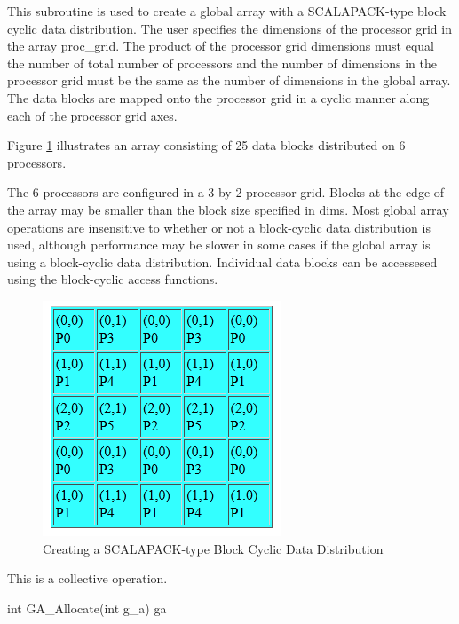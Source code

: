 \documentclass[12pt]{article}
\begin{document}
\begin{desc}

  This subroutine is used to create a global array with a
  SCALAPACK-type block cyclic data distribution. The user specifies
  the dimensions of the processor grid in the array proc_grid. The
  product of the processor grid dimensions must equal the number of
  total number of processors and the number of dimensions in the
  processor grid must be the same as the number of dimensions in the
  global array. The data blocks are mapped onto the processor grid in
  a cyclic manner along each of the processor grid axes. 

Figure \ref{setblkcyprocgrid} illustrates an array consisting of 25 data blocks distributed on 6 processors.

The 6 processors are configured in a 3 by 2 processor grid. Blocks at the edge of the array may be smaller than the block size specified in dims. Most global array operations  are insensitive to whether or not a block-cyclic data distribution is used, although performance may be slower in some cases if the global array is using a block-cyclic data distribution. Individual data blocks can be accessesed using the block-cyclic access functions.

\begin{figure}
\centering
\includegraphics{SetBlkCyProcGrid}
\caption{Creating a SCALAPACK-type Block Cyclic Data Distribution}
\label{setblkcyprocgrid}
\end{figure}

  This is a collective operation.

\end{desc}


\begin{capi}
int GA_Allocate(int g_a)
   ga                                                                     \access{[input]} 
\end{capi}
\end{document}
